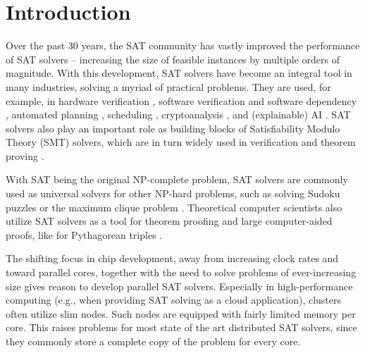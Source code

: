 \documentclass[12pt,a4paper,twoside]{scrartcl}
\numberwithin{equation}{section}
\begin{document}

\pagestyle{normal}
\renewcommand\sectionmark[1]{\markboth{\thesection\quad\MakeUppercase{#1}}{\thesection\quad\MakeUppercase{#1}}}
\renewcommand\subsectionmark[1]{\markright{\thesubsection\quad\MakeUppercase{#1}}}

\tableofcontents

\clearpage


\listoffigures
\listoftables

\clearpage


\section{Introduction}

Over the past 30 years, the SAT community has vastly improved the performance of SAT solvers -- increasing the size of feasible instances by multiple orders of magnitude. With this development, SAT solvers have become an integral tool in many industries, solving a myriad of practical problems. They are used, for example, in hardware verification \cite{vizel2015boolean}, software verification and software dependency \cite{abate2012dependency}, automated planning \cite{kautz1992planning}, scheduling \cite{metzner2005scheduling}, cryptoanalysis \cite{soos2009extending}, and (explainable) AI \cite{darwiche2020three, schidler2024sat}. SAT solvers also play an important role as building blocks of Satisfiability Modulo Theory (SMT) solvers, which are in turn widely used in verification and theorem proving \cite{monniaux2016survey}.

With SAT being the original NP-complete problem, SAT solvers are commonly used as universal solvers for other NP-hard problems, such as solving Sudoku puzzles or the maximum clique problem \cite{bright2019effective}. Theoretical computer scientists also utilize SAT solvers as a tool for theorem proofing and large computer-aided proofs, like for Pythagorean triples \cite{kumar2016study}.

The shifting focus in chip development, away from increasing clock rates and toward parallel cores, together with the need to solve problems of ever-increasing size gives reason to develop parallel SAT solvers. Especially in high-performance computing (e.g., when providing SAT solving as a cloud application), clusters often utilize slim nodes. Such nodes are equipped with fairly limited memory per core. This raises problems for most state of the art distributed SAT solvers, since they commonly store a complete copy of the problem for every core.
\end{document}
